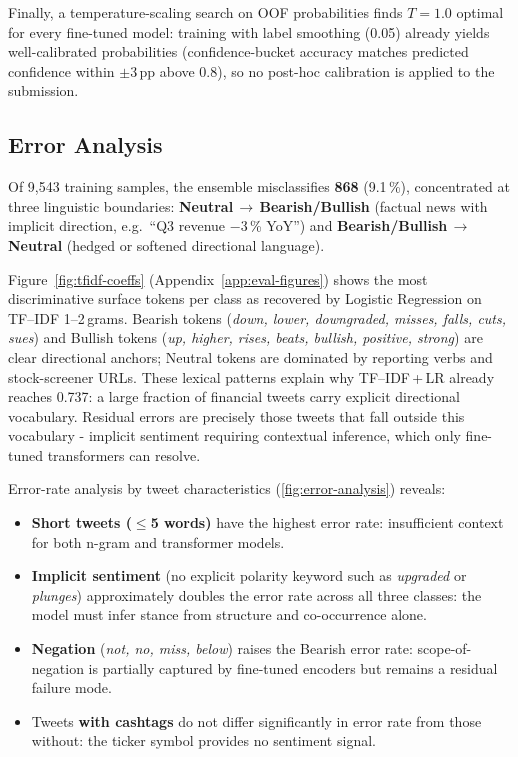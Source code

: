 \documentclass[11pt,a4paper]{article}
\newcommand{\tH}[1]{\textcolor{maincolor}{\textbf{#1}}}
\begin{document}
Finally, a temperature-scaling search on OOF probabilities finds $T = 1.0$ optimal for
every fine-tuned model: training with label smoothing (0.05) already yields well-calibrated
probabilities (confidence-bucket accuracy matches predicted confidence within $\pm$3\,pp
above 0.8), so no post-hoc calibration is applied to the submission.

\subsection{Error Analysis}
\label{sec:error}
Of 9{,}543 training samples, the ensemble misclassifies \textbf{868} (9.1\,\%),
concentrated at three linguistic boundaries: \textbf{Neutral\,$\to$\,Bearish/Bullish}
(factual news with implicit direction, e.g.\ ``Q3 revenue $-$3\,\% YoY'') and
\textbf{Bearish/Bullish\,$\to$\,Neutral} (hedged or softened directional language).

Figure~\ref{fig:tfidf-coeffs} (Appendix~\ref{app:eval-figures}) shows the most discriminative surface tokens per class as
recovered by Logistic Regression on TF--IDF 1--2\,grams. Bearish tokens (\emph{down,
lower, downgraded, misses, falls, cuts, sues}) and Bullish tokens (\emph{up, higher,
rises, beats, bullish, positive, strong}) are clear directional anchors; Neutral tokens
are dominated by reporting verbs and stock-screener URLs. These lexical patterns explain
why TF--IDF\,+\,LR already reaches 0.737: a large fraction of financial tweets carry
explicit directional vocabulary. Residual errors are precisely those tweets that fall
outside this vocabulary - implicit sentiment requiring contextual inference, which only
fine-tuned transformers can resolve.

Error-rate analysis by tweet characteristics (\ref{fig:error-analysis}) reveals:
\begin{itemize}
  \item \tH{Short tweets ($\leq$5 words)} have the highest error rate: insufficient
    context for both n-gram and transformer models.
  \item \tH{Implicit sentiment} (no explicit polarity keyword such as \emph{upgraded}
    or \emph{plunges}) approximately doubles the error rate across all three classes:
    the model must infer stance from structure and co-occurrence alone.
  \item \tH{Negation} (\emph{not, no, miss, below}) raises the Bearish error rate:
    scope-of-negation is partially captured by fine-tuned encoders but remains
    a residual failure mode.
  \item Tweets \tH{with cashtags} do not differ significantly in error rate from
    those without: the ticker symbol provides no sentiment signal.
\end{itemize}
\end{document}
